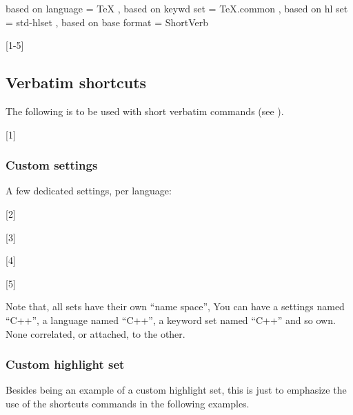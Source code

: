 \begin{codestore}[demoSettings]
    {
      based on language    = { TeX }  ,
      based on keywd set   = { TeX.common }  ,
      based on hl set      = { std-hlset }  ,
      based on base format = { ShortVerb } 
    }
\end{codestore} 

[1-5]




 \subsection{Verbatim shortcuts}


 The following is to be used with short verbatim commands (see ). 

[1]

  \subsubsection{Custom settings}  
A few dedicated settings, per language:

[2]

[3]

[4]

[5]


Note that, all sets have their own ``name space'', You can have a settings named ``C++'', a language named ``C++'', a keyword set named ``C++'' and so own. None correlated, or attached, to the other.

\subsubsection{Custom highlight set}
Besides being an example of a custom highlight set, this is just to emphasize the use of the shortcuts commands in the following examples.


